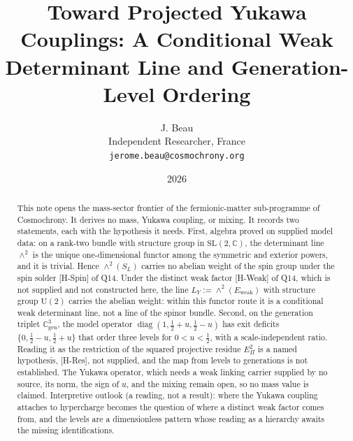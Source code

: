 \documentclass[11pt]{article}
\title{
  Toward Projected Yukawa Couplings:
  A Conditional Weak Determinant Line and Generation-Level Ordering
}
\author{J. Beau\\
Independent Researcher, France\\
\texttt{jerome.beau@cosmochrony.org}}
\date{2026}
\theoremstyle{definition}
\theoremstyle{remark}
\newcommand{\Cgen}{\mathbb{C}^{3}_{\mathrm{gen}}}
\newcommand{\Epi}{E_{\Pi}}
\newcommand{\SW}{S_{L}}
\newcommand{\Ew}{E_{\mathrm{weak}}}
\newcommand{\LY}{L_{Y}}
\newcommand{\UU}{\mathrm{U}}
\newcommand{\SL}{\mathrm{SL}}
\newcommand{\diag}{\operatorname{diag}}
\begin{document}
  \maketitle

  \begin{abstract}
    This note opens the mass-sector frontier of the fermionic-matter sub-programme of Cosmochrony.
    It derives no mass, Yukawa coupling, or mixing.
    It records two statements, each with the hypothesis it needs.
    First, algebra proved on supplied model data: on a rank-two bundle with structure group in
    \texorpdfstring{$\SL(2,\mathbb{C})$}{SL(2,C)},
    the determinant line \texorpdfstring{$\wedge^{2}$}{∧²} is the unique one-dimensional functor among the symmetric and
    exterior powers, and it is trivial.
    Hence \texorpdfstring{$\wedge^{2}(\SW)$}{∧²(S_L)} carries no abelian weight of the spin group
    under the spin solder [H-Spin] of Q14.
    Under the distinct weak factor [H-Weak] of Q14, which is not supplied and not constructed here, the line
    \texorpdfstring{$\LY := \wedge^{2}(\Ew)$}{L_Y ≔ ∧²(E_weak)}
    with structure group \texorpdfstring{$\UU(2)$}{U(2)} carries the abelian weight:
    within this functor route it is a conditional weak determinant line, not a line of the spinor bundle.
    Second, on the generation triplet \texorpdfstring{$\Cgen$}{C³_gen}, the model operator
    \texorpdfstring{$\diag(1, \tfrac12 + u, \tfrac12 - u)$}{diag(1, 1/2 + u, 1/2 - u)} has exit deficits
    \texorpdfstring{$\{0, \tfrac12 - u, \tfrac12 + u\}$}{0, 1/2 - u, 1/2 + u}
    that order three levels for \texorpdfstring{$0 < u < \tfrac12$}{0 < u < 1/2},
    with a scale-independent ratio.
    Reading it as the restriction of the squared projective residue \texorpdfstring{$\Epi^{2}$}{E_Π²}
    is a named hypothesis, [H-Res], not supplied, and the map from levels to generations is not established.
    The Yukawa operator, which needs a weak linking carrier supplied by no source, its norm,
    the sign of \texorpdfstring{$u$}{u}, and the mixing remain open, so no mass value is claimed.
    Interpretive outlook (a reading, not a result): where the Yukawa coupling attaches to hypercharge becomes the
    question of where a distinct weak factor comes from, and the levels are a dimensionless pattern whose reading as a
    hierarchy awaits the missing identifications.
  \end{abstract}

\end{document}
